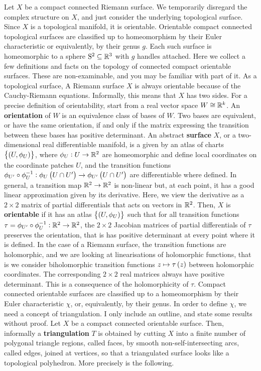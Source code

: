 Let $ X $ be a compact connected Riemann surface. We temporarily disregard the complex structure on $ X $, and just consider the underlying topological surface. Since $ X $ is a topological manifold, it is orientable. Orientable compact connected topological surfaces are classified up to homeomorphism by their Euler characteristic or equivalently, by their genus $ g $. Each such surface is homeomorphic to a sphere $ \mathrm{S}^2 \subseteq \mathbb{R}^3 $ with $ g $ handles attached. Here we collect a few definitions and facts on the topology of connected compact orientable surfaces. These are non-examinable, and you may be familiar with part of it. As a topological surface, A Riemann surface $ X $ is always orientable because of the Cauchy-Riemann equations. Informally, this means that $ X $ has two sides. For a precise definition of orientability, start from a real vector space $ W \cong \mathbb{R}^k $. An \textbf{orientation} of $ W $ is an equivalence class of bases of $ W $. Two bases are equivalent, or have the same orientation, if and only if the matrix expressing the transition between these bases has positive determinant. An abstract \textbf{surface} $ X $, or a two-dimensional real differentiable manifold, is a given by an atlas of charts $ \cbr{\br{U, \phi_U}} $, where $ \phi_U : U \to \mathbb{R}^2 $ are homeomorphic and define local coordinates on the coordinate patches $ U $, and the transition functions $ \phi_{U'} \circ \phi_U^{-1} : \phi_U\br{U \cap U'} \to \phi_{U'}\br{U \cap U'} $ are differentiable where defined. In general, a transition map $ \mathbb{R}^2 \to \mathbb{R}^2 $ is non-linear but, at each point, it has a good linear approximation given by its derivative. Here, we view the derivative as a $ 2 \times 2 $ matrix of partial differentials that acts on vectors in $ \mathbb{R}^2 $. Then, $ X $ is \textbf{orientable} if it has an atlas $ \cbr{\br{U, \phi_U}} $ such that for all transition functions $ \tau = \phi_{U'} \circ \phi_U^{-1} : \mathbb{R}^2 \to \mathbb{R}^2 $, the $ 2 \times 2 $ Jacobian matrices of partial differentials of $ \tau $ preserves the orientation, that is has positive determinant at every point where it is defined. In the case of a Riemann surface, the transition functions are holomorphic, and we are looking at linearisations of holomorphic functions, that is we consider biholomorphic transition functions $ z \mapsto \tau\br{z} $ between holomorphic coordinates. The corresponding $ 2 \times 2 $ real matrices always have positive determinant. This is a consequence of the holomorphicity of $ \tau $. Compact connected orientable surfaces are classified up to a homeomorphism by their Euler characteristic $ \chi $, or, equivalently, by their genus. In order to define $ \chi $, we need a concept of triangulation. I only include an outline, and state some results without proof. Let $ X $ be a compact connected orientable surface. Then, informally a \textbf{triangulation} $ T $ is obtained by cutting $ X $ into a finite number of polygonal triangle regions, called faces, by smooth non-self-intersecting arcs, called edges, joined at vertices, so that a triangulated surface looks like a topological polyhedron. More precisely is the following.
